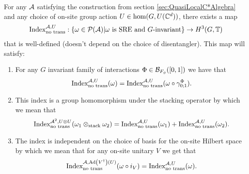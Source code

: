 \documentclass[11pt,a4paper,twoside]{article}
\numberwithin{equation}{section}
\begin{document}
	\begin{theorem}\label{thrm:ExistenceOriginalIndex}
		For any $\AA$ satisfying the construction from section \ref{sec:QuasiLocalC*Algebra} and any choice of on-site group action $U\in\hom(G,U(\CC^d))$, there exists a map
		\begin{equation}
			\textrm{Index}^{\AA,U}_{\text{no trans}}:\{\omega\in\PP(\AA)| \omega\text{ is SRE and }G\text{-invariant}\}\rightarrow H^3(G,\TT)
		\end{equation}
		that is well-defined (doesn't depend on the choice of disentangler). This map will satisfy:
		\begin{enumerate}
			\item For any $G$ invariant family of interactions $\Phi\in\BB_{F_\phi}([0,1])$ we have that
			\begin{equation}
				\textrm{Index}^{\AA,U}_{\text{no trans}}(\omega)=\textrm{Index}^{\AA,U}_{\text{no trans}}(\omega\circ\gamma^\Phi_{0;1}).
			\end{equation}
			\item This index is a group homomorphism under the stacking operator by which we mean that
			\begin{equation}
				\textrm{Index}_{\text{no trans}}^{\AA^2,U\otimes U}(\omega_1\otimes_{\text{stack}}\omega_2)=\textrm{Index}_{\text{no trans}}^{\AA,U}(\omega_1)+\textrm{Index}_{\text{no trans}}^{\AA,U}(\omega_2).
			\end{equation}
			\item The index is independent on the choice of basis for the on-site Hilbert space by which we mean that for any on-site unitary $V$ we get that
			\begin{equation}
				\textrm{Index}^{\AA,\Ad{V^\dagger}(U)}_{\text{no trans}}(\omega\circ i_V) =\textrm{Index}^{\AA,U}_{\text{no trans}}(\omega).
			\end{equation}
		\end{enumerate}
	\end{theorem}
\end{document}
